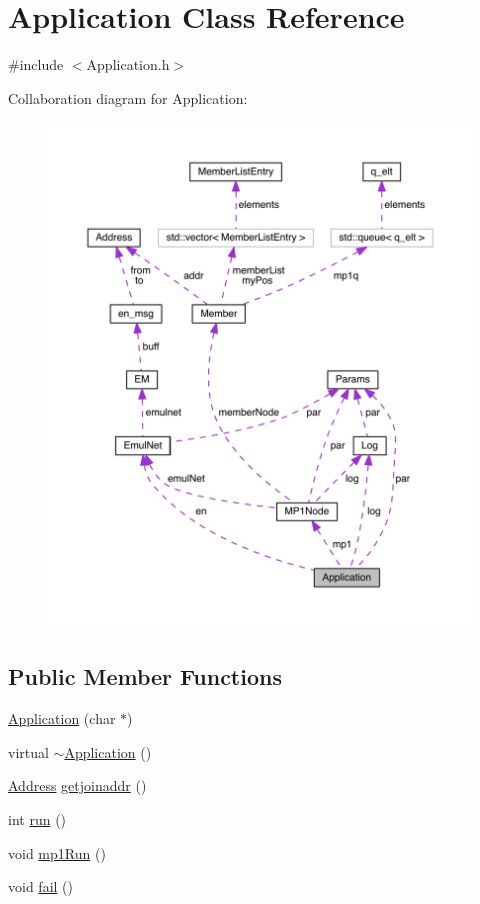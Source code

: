 \hypertarget{class_application}{}\section{Application Class Reference}
\label{class_application}


{\ttfamily \#include $<$Application.\+h$>$}



Collaboration diagram for Application\+:\nopagebreak
\begin{figure}[H]
\begin{center}
\leavevmode
\includegraphics[width=350pt]{d2/d07/class_application__coll__graph}
\end{center}
\end{figure}
\subsection*{Public Member Functions}
\begin{DoxyCompactItemize}
\item 
\hyperlink{class_application_a780412190c529b3445ea73912b9c3a32}{Application} (char $\ast$)
\item 
virtual \hyperlink{class_application_a748bca84fefb9c12661cfaa2f623748d}{$\sim$\+Application} ()
\item 
\hyperlink{class_address}{Address} \hyperlink{class_application_ac01a037d21d4d7e9f4f9ba1836709846}{getjoinaddr} ()
\item 
int \hyperlink{class_application_a8cf8941c8db90117d3735bce5ae1fdf4}{run} ()
\item 
void \hyperlink{class_application_a4ee14b17094145f2b3c174500932adc8}{mp1\+Run} ()
\item 
void \hyperlink{class_application_a867c9c2a20e754ab3b1de41cff822157}{fail} ()
\end{DoxyCompactItemize}

